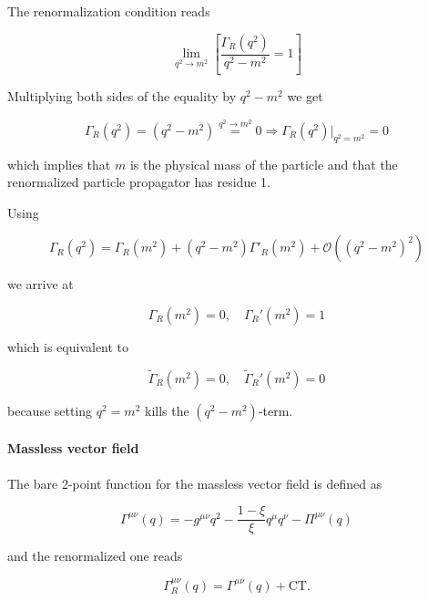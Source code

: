 \documentclass[../FeynCalcManual.tex]{subfiles}
\begin{document}
The renormalization condition reads

\begin{equation}
\lim_{q^2 \to m^2} \left [ \frac{\Gamma_R (q^2)}{q^2 - m^2}  = 1 \right ]
\end{equation}

Multiplying both sides of the equality by \(q^2-m^2\) we get

\begin{equation}
\Gamma_R (q^2)  = ( q^2-m^2) \overset{q^2 \to m^2}{=} 0 \Rightarrow \Gamma_R (q^2) \biggl |_{q^2=m^2}  = 0
\end{equation}

which implies that \(m\) is the physical mass of the particle and that
the renormalized particle propagator has residue 1.

Using

\begin{equation}
\Gamma_R (q^2) =  \Gamma_R (m^2) + (q^2 - m^2) \Gamma'_R (m^2) + \mathcal{O}( (q^2 - m^2)^2)
\end{equation}

we arrive at

\begin{equation}
\Gamma_R(m^2) = 0, \quad \Gamma_R'(m^2) = 1
\end{equation}

which is equivalent to

\begin{equation}
\tilde{\Gamma}_R(m^2) = 0, \quad \tilde{\Gamma}_R'(m^2) = 0
\end{equation}

because setting \(q^2 = m^2\) kills the \((q^2-m^2)\)-term.

\hypertarget{massless-vector-field}{%
\paragraph{Massless vector field}\label{massless-vector-field}}

The bare 2-point function for the massless vector field is defined as

\begin{equation}
    \Gamma^{\mu \nu} (q) = -g^{\mu \nu} q^2 - \frac{1-\xi}{\xi} q^{\mu} q^{\nu}  - \Pi^{\mu \nu} (q)
\end{equation}

and the renormalized one reads

\begin{equation}
    \Gamma_R^{\mu \nu} (q) = \Gamma^{\mu \nu} (q) + \text{CT}.
\end{equation}
\end{document}

